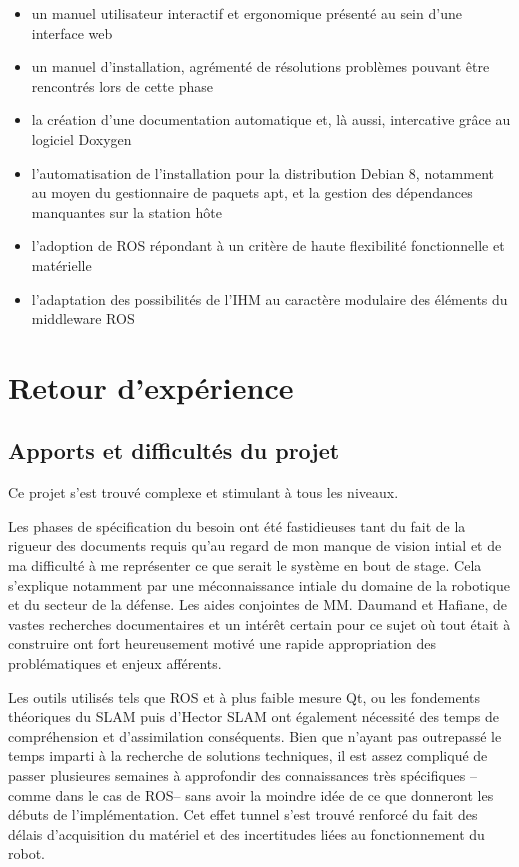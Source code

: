   \begin{itemize}
   \item un manuel utilisateur interactif et ergonomique présenté au sein d'une interface web
   \item un manuel d'installation, agrémenté de résolutions problèmes pouvant être rencontrés lors de cette phase
   \item la création d'une documentation automatique et, là aussi, intercative grâce au logiciel Doxygen
   \item l'automatisation de l'installation pour la distribution Debian 8, notamment au moyen du gestionnaire de paquets apt, et la gestion des dépendances manquantes sur la station hôte
   \item l'adoption de ROS répondant à un critère de haute flexibilité fonctionnelle et matérielle
   \item l'adaptation des possibilités de l'IHM au caractère modulaire des éléments du middleware ROS 
  \end{itemize}
  
  
  
\section{Retour d'expérience}
  \subsection{Apports et difficultés du projet}
  
  Ce projet s'est trouvé complexe et stimulant à tous les niveaux. 
  
  Les phases de spécification du besoin ont été fastidieuses tant du fait de la rigueur des documents requis qu'au regard de mon manque de vision intial et de ma difficulté à me représenter ce que serait le système en bout de stage. 
  Cela s'explique notamment par une méconnaissance intiale du domaine de la robotique et du secteur de la défense.
  Les aides conjointes de MM. Daumand et Hafiane, de vastes recherches documentaires et un intérêt certain pour ce sujet où tout était à construire ont fort heureusement motivé une rapide appropriation des problématiques et enjeux afférents. 
  
  Les outils utilisés tels que ROS et à plus faible mesure Qt, ou les fondements théoriques du SLAM puis d'Hector SLAM ont également nécessité des temps de compréhension et d'assimilation conséquents. 
  Bien que n'ayant pas outrepassé le temps imparti à la recherche de solutions techniques, il est assez compliqué de passer plusieures semaines à approfondir des connaissances très spécifiques --comme dans le cas de ROS-- sans 
  avoir la moindre idée de ce que donneront les débuts de l'implémentation. 
  Cet effet tunnel s'est trouvé renforcé du fait des délais d'acquisition du matériel et des incertitudes liées au fonctionnement du robot. 
  
